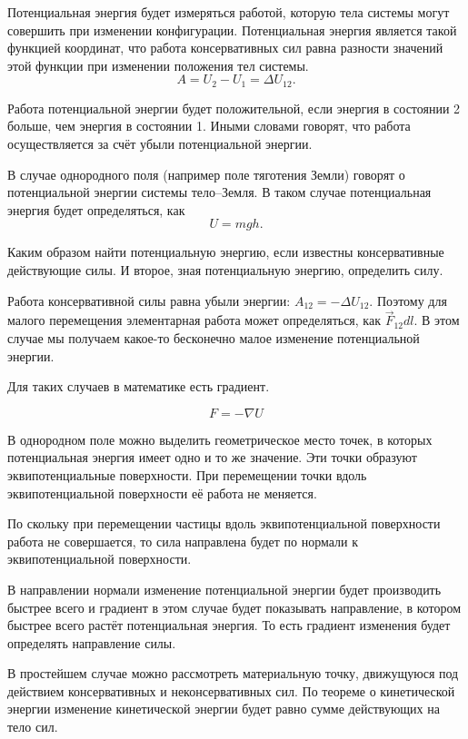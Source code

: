 \documentclass[10pt]{extbook}
\begin{document}
Потенциальная энергия будет измеряться работой, которую тела системы могут
совершить при изменении конфигурации. Потенциальная энергия является такой
функцией координат, что работа консервативных сил равна разности значений этой
функции при изменении положения тел системы.
\[
	A = U_2 - U_1 = \Delta U_{12}
	.\]

Работа потенциальной энергии будет положительной, если энергия в состоянии 2
больше, чем энергия в состоянии 1. Иными словами говорят, что работа
осуществляется за счёт убыли потенциальной энергии.

В случае однородного поля (например поле тяготения Земли) говорят о потенциальной энергии системы тело--Земля. В таком случае потенциальная энергия будет определяться, как \[
	U = m g h
	.\]

Каким образом найти потенциальную энергию, если известны консервативные
действующие силы.
И второе, зная потенциальную энергию, определить силу.

Работа консервативной силы равна убыли энергии: \( A_{12} = - \Delta U_{12} \).
Поэтому для малого перемещения элементарная работа может определяться, как \(
\vec{F}_{12} dl \). В этом случае мы получаем какое-то бесконечно малое
изменение потенциальной энергии.

Для таких случаев в математике есть градиент.

\begin{equation}
	F = - \nabla U
\end{equation}

В однородном поле можно выделить геометрическое место точек, в которых
потенциальная энергия имеет одно и то же значение. Эти точки образуют
эквипотенциальные поверхности. При перемещении точки вдоль эквипотенциальной
поверхности её работа не меняется.

По скольку при перемещении частицы вдоль эквипотенциальной поверхности работа
не совершается, то сила направлена будет по нормали к эквипотенциальной
поверхности.

В направлении нормали изменение потенциальной энергии будет производить быстрее
всего и градиент в этом случае будет показывать направление, в котором быстрее
всего растёт потенциальная энергия. То есть градиент изменения будет определять
направление силы.



В простейшем случае можно рассмотреть материальную точку, движущуюся под
действием консервативных и неконсервативных сил. По теореме о кинетической
энергии изменение кинетической энергии будет равно сумме действующих на тело
сил.
\end{document}
